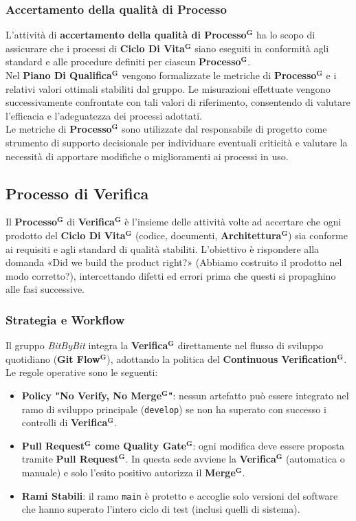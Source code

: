\documentclass[a4paper,12pt]{article}
\newcommand{\term}[1]{\textbf{#1}$^\mathbf{G}$}
\newcommand{\ignoreglossary}{}
\begin{document}
\subsubsection{Accertamento della qualità di Processo}
L’attività di \textbf{accertamento della qualità di \term{Processo}} ha lo scopo di assicurare che i processi di \term{Ciclo Di Vita} siano eseguiti in conformità agli standard e alle procedure definiti per ciascun \term{Processo}.\\
Nel \term{Piano Di Qualifica} vengono formalizzate le metriche di \term{Processo} e i relativi valori ottimali stabiliti dal gruppo.
Le misurazioni effettuate vengono successivamente confrontate con tali valori di riferimento, consentendo di valutare l’efficacia e l’adeguatezza dei processi adottati.\\
Le metriche di \term{Processo} sono utilizzate dal responsabile di progetto come strumento di supporto decisionale per individuare eventuali criticità e valutare la necessità di apportare modifiche o miglioramenti ai processi in uso.

\subsection{Processo di \ignoreglossary{Verifica}} \label{sec:processo-verifica}
Il \term{Processo} di \term{Verifica} è l'insieme delle attività volte ad accertare che ogni prodotto del \term{Ciclo Di Vita} (codice, documenti, \term{Architettura}) sia conforme ai requisiti e agli standard di qualità stabiliti.
L'obiettivo è rispondere alla domanda «Did we build the product right?» (Abbiamo costruito il prodotto nel modo corretto?), intercettando difetti ed errori prima che questi si propaghino alle fasi successive.

\subsubsection{Strategia e Workflow}
Il gruppo \textit{BitByBit} integra la \term{Verifica} direttamente nel flusso di sviluppo quotidiano (\term{Git Flow}), adottando la politica del \textbf{\term{Continuous Verification}}.
Le regole operative sono le seguenti:
\begin{itemize}
    \item \textbf{Policy "No Verify, No \term{Merge}"}: nessun artefatto può essere integrato nel ramo di sviluppo principale (\texttt{develop}) se non ha superato con successo i controlli di \term{Verifica}.
    \item \textbf{\term{Pull Request} come \term{Quality Gate}}: ogni modifica deve essere proposta tramite \term{Pull Request}. In questa sede avviene la \term{Verifica} (automatica o manuale) e solo l'esito positivo autorizza il \term{Merge}.
    \item \textbf{Rami Stabili}: il ramo \texttt{main} è protetto e accoglie solo versioni del software che hanno superato l'intero ciclo di test (inclusi quelli di sistema).
\end{itemize}
\end{document}
